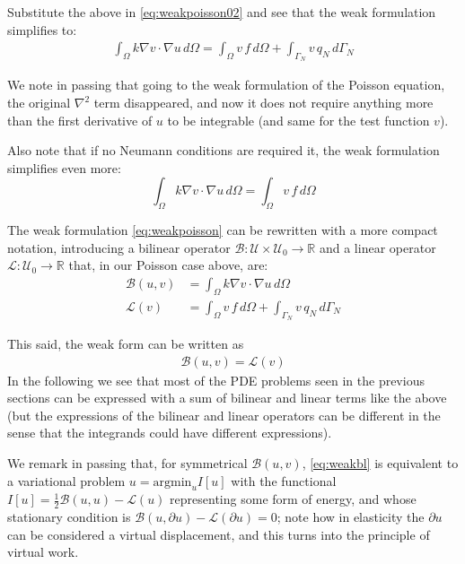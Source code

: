 \documentclass{digitaldynamics}
\begin{document}
Substitute the above in \eqref{eq:weakpoisson02} and see that the weak formulation simplifies to:
\begin{align}
  \int_\Omega k \nabla v \cdot \nabla u \,d\Omega = \int_\Omega  v \, f  \,d\Omega  + \int_{\Gamma_N} v \, q_N \,d\Gamma_N
	\label{eq:weakpoisson}
\end{align}

We note in passing that going to the weak formulation of the Poisson equation, the original $\nabla^2$ term disappeared, 
and now it does not require anything more than the first derivative of $u$ to be integrable 
(and same for the test function $v$).

Also note that if no Neumann conditions are required it, the weak formulation simplifies even more: 
\[
\int_\Omega k \nabla v \cdot \nabla u \,d\Omega = \int_\Omega  v \, f \,d\Omega 
\]

The weak formulation \eqref{eq:weakpoisson} can be rewritten with a more compact notation, introducing a
bilinear operator 
$\mathcal{B}: \mathcal{U} \times \mathcal{U}_0 \rightarrow \mathbb{R}$ 
and a linear operator 
$\mathcal{L}:  \mathcal{U}_0 \rightarrow \mathbb{R}$ 
that, in our Poisson case above, are:
\begin{align}
  \mathcal{B}(u,v) &= \int_\Omega k \nabla v \cdot \nabla u \,d\Omega      \label{eq:bilinearop}\\
	\mathcal{L}(v)   &= \int_\Omega v \, f \,d\Omega    + \int_{\Gamma_N} v \, q_N \,d\Gamma_N         \label{eq:linearop}
\end{align}

This said, the weak form can be written as
\begin{align}
\boxed{
\mathcal{B}(u,v) = \mathcal{L}(v)
}
\label{eq:weakbl}
\end{align}
In the following we see that most of the PDE problems seen in the previous sections can be expressed with a sum of bilinear and linear terms like the above (but the expressions of the bilinear and linear operators can be different in the sense that the integrands could have different expressions).

We remark in passing that, for symmetrical $\mathcal{B}(u,v)$, \eqref{eq:weakbl} is equivalent to a variational problem $u = \mathrm{argmin}_{u}I[u]$ with the functional $I[u]=\frac{1}{2}\mathcal{B}(u,u) - \mathcal{L}(u)$ representing some form of energy, and whose stationary condition is $\mathcal{B}(u,\partial u) - \mathcal{L}(\partial u) = 0$; note how in elasticity the $\partial u$ can be considered a virtual displacement, and this turns into the principle of virtual work. 
\end{document}
